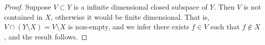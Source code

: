 \begin{proof}
    Suppose \(V \subset Y\) is a infinite dimensional closed subspace of \(Y\). Then \(V\) is not contained in \(X\), otherwise it would be finite dimensional. That is, \(V \cap (Y \setminus X) = V \setminus X\) is non-empty, and we infer there exists \(f \in V\) such that \(f \notin X\), and the result follows.
\end{proof}
